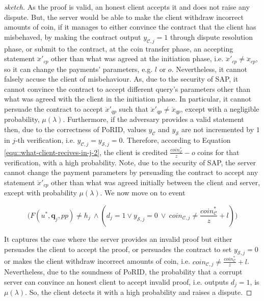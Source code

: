 \begin{proof}[sketch]
    
As the  proof is valid, an honest client accepts it and does not raise any dispute. But, the server  would be able to make the client  withdraw incorrect amounts of coin, if it manages to either convince the contract that the client has misbehaved, by making the contract output  $y_{\scriptscriptstyle\mathcal {C},j}=1$ through dispute resolution phase, or submit to the contract, at the coin transfer phase,  an accepting  statement $\ddot{x}'_{\scriptscriptstyle cp}$ other than what was agreed at the initiation phase, i.e. $\ddot{x}'_{\scriptscriptstyle cp}\neq\ddot{x}_{\scriptscriptstyle cp}$, so it can change the payments' parameters, e.g. $l$ or $o$. Nevertheless, it cannot falsely accuse the client of misbehaviour. As,  due to the security of SAP, it cannot  convince the contract to accept different query's parameters other than what was agreed with the client in the initiation phase. In particular, it cannot persuade the contract to accept  $\ddot{x}'_{\scriptscriptstyle qp}$ such that $\ddot{x}'_{\scriptscriptstyle qp}\neq \ddot{x}_{\scriptscriptstyle qp}$, except with a negligible probability, $\mu(\lambda)$.  Furthermore, if the adversary provides a valid statement then, due to the correctness of PoRID, values  $y_{\scriptscriptstyle\mathcal {C}}$ and $y_{\scriptscriptstyle\mathcal {S}}$ are not incremented by $1$  in $j$-th verification, i.e. $y_{\scriptscriptstyle\mathcal{C},j}=y_{\scriptscriptstyle\mathcal{S},j}=0$. Therefore, according to Equation \ref{equ::what-client-recives-in-j-2}, the client is credited $\frac{coin_{\scriptscriptstyle\mathcal C}^{\scriptscriptstyle*}}{z}-o$ coins for that verification, with a high probability. Note,  due to the security of SAP, the server cannot change the payment parameters by persuading the contract to accept any statement $\ddot{x}'_{\scriptscriptstyle cp}$ other than what was agreed initially between the client and server, except with  probability $\mu(\lambda)$.  We now move on to event 
     
    
    
  $$  \Big(F(u^{\scriptscriptstyle *},\bm{q}_{\scriptscriptstyle j}, {pp})\neq h_{\scriptscriptstyle j} \ \wedge (d_{\scriptscriptstyle j}=1	\vee y_{\scriptscriptstyle \mathcal{S},j}=0 \ \vee \  {coin_{\scriptscriptstyle\mathcal{C},j}\neq \frac{coin_{\scriptscriptstyle\mathcal C}^{\scriptscriptstyle*}}{z}+l} ) \Big)$$
    
    
    
     
     It captures the case where the server provides an invalid  proof but either persuades the client to accept the proof, or  persuades the contract to set $y_{\scriptscriptstyle \mathcal{S},j}=0$  or makes the client  withdraw incorrect amounts of coin, i.e.    $coin_{\scriptscriptstyle\mathcal{C},j}\neq \frac{coin_{\scriptscriptstyle\mathcal C}^{\scriptscriptstyle*}}{z}+l$.   Nevertheless, due to the soundness of PoRID, the probability that a corrupt server can convince an honest client to accept invalid proof, i.e. outputs $d_{\scriptscriptstyle j}=1$, is  $\mu(\lambda)$. So, the client detects it with a high probability and raises a dispute. 
     

\end{proof}
